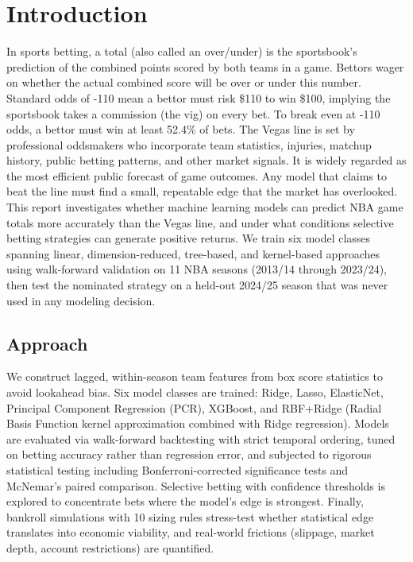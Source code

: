\documentclass[11pt]{extarticle}
\begin{document}
\section{Introduction}
In sports betting, a total (also called an over/under) is the sportsbook's prediction of the combined points scored by
both teams in a game. Bettors wager on whether the actual combined score will be over or under this number.
Standard odds of -110 mean a bettor must risk \$110 to win \$100, implying the sportsbook takes a commission (the
vig) on every bet. To break even at -110 odds, a bettor must win at least 52.4\% of bets.
The Vegas line is set by professional oddsmakers who incorporate team statistics, injuries, matchup history, public
betting patterns, and other market signals. It is widely regarded as the most efficient public forecast of game
outcomes. Any model that claims to beat the line must find a small, repeatable edge that the market has overlooked. \\
This report investigates whether machine learning models can predict NBA game totals more accurately than the
Vegas line, and under what conditions selective betting strategies can generate positive returns. We train six model
classes spanning linear, dimension-reduced, tree-based, and kernel-based approaches using walk-forward validation
on 11 NBA seasons (2013/14 through 2023/24), then test the nominated strategy on a held-out 2024/25 season that
was never used in any modeling decision.

\subsection{Approach}
We construct lagged, within-season team features from box score statistics to avoid lookahead bias. Six model
classes are trained: Ridge, Lasso, ElasticNet, Principal Component Regression (PCR), XGBoost, and RBF+Ridge
(Radial Basis Function kernel approximation combined with Ridge regression). Models are evaluated via
walk-forward backtesting with strict temporal ordering, tuned on betting accuracy rather than regression error, and
subjected to rigorous statistical testing including Bonferroni-corrected significance tests and McNemar's paired
comparison. Selective betting with confidence thresholds is explored to concentrate bets where the model's edge is
strongest. Finally, bankroll simulations with 10 sizing rules stress-test whether statistical edge translates into
economic viability, and real-world frictions (slippage, market depth, account restrictions) are quantified.
\end{document}
